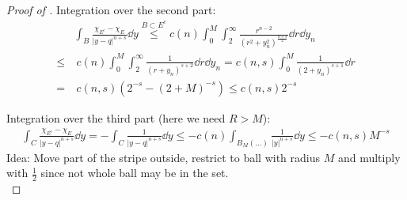 \begin{proof}[Proof of ]
	Integration over the second part:
	\begin{align*}
		     & \int_B \frac{\chi_{E^c} - \chi_E}{\lvert y - q\rvert^{n + s}} \dd{y} \overset{B \subset E^c}{\leq} c(n) \int_0^M \int_2^\infty \frac{r^{n - 2}}{(r^2 + y_n^2)^{\frac{n + s}{2}}} \dd{r} \dd{y_n} \\
		\leq & \ c(n) \int_0^M \int_2^\infty \frac{1}{(r + y_n)^{s + 2}} \dd{r} \dd{y_n} = c(n, s) \int_0^M \frac{1}{(2 + y_n)^{s + 1}} \dd{r} \\
		=    & \ c(n, s)(2^{- s} - (2 + M)^{- s}) \leq c(n, s) 2^{- s}
	\end{align*}

	Integration over the third part (here we need \( R > M \)):
	\begin{align*}
		\int_C \frac{\chi_{E^c} - \chi_E}{\lvert y - q\rvert^{n + s}} \dd{y} = - \int_C \frac{1}{\lvert y - q \rvert^{n + s}} \dd{y} \leq - c(n) \int_{B_M (\ldots)} \frac{1}{\lvert y\rvert^{n + s}} \dd{y} \leq - c(n, s) M^{- s}
	\end{align*}
	Idea: Move part of the stripe outside, restrict to ball with radius \( M \) and
	multiply with \( \frac{1}{2} \) since not whole ball may be in the set.\\


\end{proof}
